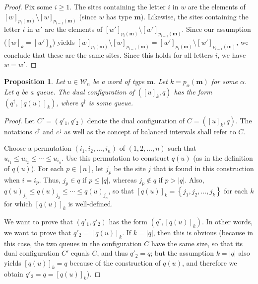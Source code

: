 \documentclass[reqno]{amsart}
\newcommand{\0}{\phantom{c}}
\newcommand{\mm}{\mathbf{m}}
\newcommand{\mcW}{\mathcal{W}}
\newenvironment{verlong}{}{}
\newcommand{\set}[1]{\left\{ #1 \right\}}
\newcommand{\abs}[1]{\left| #1 \right|}
\newcommand{\tup}[1]{\left( #1 \right)}
\newcommand{\ive}[1]{\left[ #1 \right]}
\theoremstyle{plain}
\newtheorem{prop}[thm]{Proposition}
\theoremstyle{definition}
\numberwithin{equation}{section}
\newcommand{\Darij}[1]{\todo[size=\tiny,inline,color=red!30]{#1
      \\ \hfill --- Darij}}
\newcommand{\travis}[1]{\todo[size=\tiny,color=blue!30]{#1 \\ \hfill --- Travis}}
\begin{document}
\begin{verlong}
\begin{proof}
Fix some $i \geq 1$.
The sites containing the letter $i$ in $w$ are the elements of $[w]_{p_i(\mm)} \setminus [w]_{p_{i-1}(\mm)}$
(since $w$ has type $\mm$).
Likewise,
the sites containing the letter $i$ in $w'$ are the elements of $[w']_{p_i(\mm)} \setminus [w']_{p_{i-1}(\mm)}$.
Since our assumption ($[w]_k = [w']_k$) yields $[w]_{p_i(\mm)} \setminus [w]_{p_{i-1}(\mm)}
= [w']_{p_i(\mm)} \setminus [w']_{p_{i-1}(\mm)}$, %
we conclude that these are the same sites.
Since this holds for all letters $i$, we have $w = w'$.
\end{proof}

\begin{prop} \label{prop:SL.dual-old6}
Let $u \in \mcW_n$ be a word of type $\mm$.
Let $k = p_{\alpha}(\mm)$ for some $\alpha$.
Let $q$ be a queue.
The dual configuration of $\tup{ [u]_k , q }$ has the form $\tup{q^{\dagger} , [q(u)]_k }$, where $q^{\dagger}$ is some queue.
\end{prop}

\begin{proof} %
Let $C' = (q'_1, q'_2)$ denote the dual configuration of $C = \tup{ [u]_k , q }$.
The notations $c^{\uparrow}$ and $c^{\downarrow}$ as well as the concept of balanced
intervals shall refer to $C$.

Choose a permutation $\tup{i_1, i_2, \ldots, i_n}$ of $\tup{1, 2, \ldots, n}$
such that $u_{i_1} \leq u_{i_2} \leq \cdots \leq u_{i_n}$.
Use this permutation to construct $q(u)$ (as in the definition of $q(u)$).
For each $p \in \ive{n}$, let $j_p$ be the site $j$ that is found in this construction when $i = i_p$.
Thus, $j_p \in q$ if $p \leq \abs{q}$, whereas $j_p \notin q$ if $p > \abs{q}$.
Also, $q(u)_{j_1} \leq q(u)_{j_2} \leq \cdots \leq q(u)_{j_n}$, so that
$[q(u)]_k = \set{j_1, j_2, \ldots, j_k}$ for each $k$ for which $[q(u)]_k$ is well-defined.

We want to prove that $(q'_1, q'_2)$ has the form $\tup{q^{\dagger} , [q(u)]_k }$.
In other words, we want to prove that $q'_2 = [q(u)]_k$.
If $k = \abs{q}$, then this is obvious (because in this case, the two queues in the configuration $C$ have the same size, so that its dual configuration $C'$ equals $C$, and thus $q'_2 = q$; but the assumption $k = \abs{q}$ also yields $[q(u)]_k = q$ because of the construction of $q(u)$, and therefore we obtain $q'_2 = q = [q(u)]_k$).


\end{proof}
\end{verlong}
\end{document}
